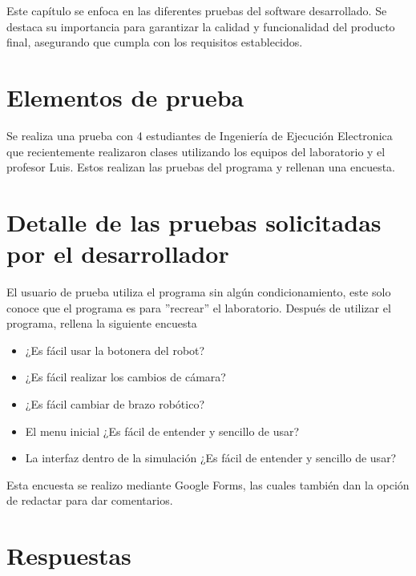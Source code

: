 Este capítulo se enfoca en las diferentes pruebas del software desarrollado. Se destaca su importancia para garantizar la calidad y funcionalidad del producto final, asegurando que cumpla con los requisitos establecidos.
\section{Elementos de prueba}
Se realiza una prueba con 4 estudiantes de Ingeniería de Ejecución Electronica que recientemente realizaron clases utilizando los equipos del laboratorio y el profesor Luis.
Estos realizan las pruebas del programa y rellenan una encuesta.

\section{Detalle de las pruebas solicitadas por el desarrollador}
El usuario de prueba utiliza el programa sin algún condicionamiento, este solo conoce que el programa es para ''recrear'' el laboratorio.
Después de utilizar el programa, rellena la siguiente encuesta
\begin{itemize}
\item ¿Es fácil usar la botonera del robot?
\item ¿Es fácil realizar los cambios de cámara?
\item ¿Es fácil cambiar de brazo robótico?
\item El menu inicial ¿Es fácil de entender y sencillo de usar?
\item La interfaz dentro de la simulación ¿Es fácil de entender y sencillo de usar?
\end{itemize}

Esta encuesta se realizo mediante Google Forms, las cuales también dan la opción de redactar para dar comentarios.

\clearpage
\section{Respuestas}

